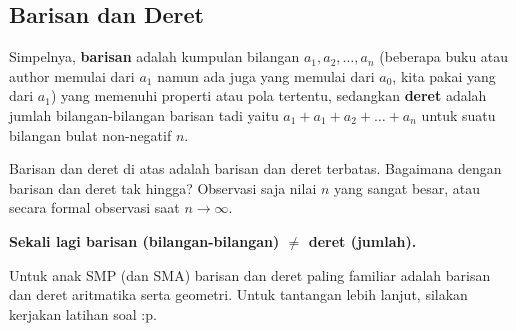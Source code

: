 \subsection{Barisan dan Deret}
Simpelnya, \textbf{barisan} adalah kumpulan bilangan $a_1,a_2,\dots,a_n$ (beberapa buku atau author memulai dari $a_1$ namun ada juga yang memulai dari $a_0$, kita pakai yang dari $a_1$) yang memenuhi properti atau pola tertentu, sedangkan \textbf{deret} adalah jumlah bilangan-bilangan barisan tadi yaitu $a_1+a_1+a_2+\dots+a_n$ untuk suatu bilangan bulat non-negatif $n$.

Barisan dan deret di atas adalah barisan dan deret terbatas. Bagaimana dengan barisan dan deret tak hingga? Observasi saja nilai $n$ yang sangat besar, atau secara formal observasi saat $n \rightarrow \infty.$

\textbf{Sekali lagi barisan (bilangan-bilangan) $\neq$ deret (jumlah).}

Untuk anak SMP (dan SMA) barisan dan deret paling familiar adalah barisan dan deret aritmatika serta geometri. Untuk tantangan lebih lanjut, silakan kerjakan latihan soal :p.





